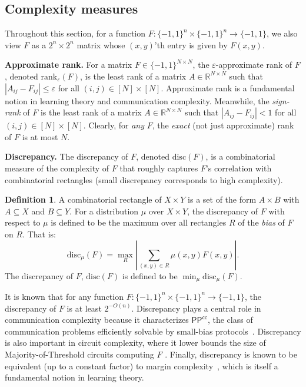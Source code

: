 \documentclass[11pt]{article}
\numberwithin{equation}{section}
\theoremstyle{definition}
\newtheorem{definition}[theorem]{Definition}
\theoremstyle{plain}
\newcommand{\R}{\mathbb R}
\newcommand{\bits}{\{-1,1\}}
\newcommand{\eps}{\varepsilon}
\begin{document}
\subsection{Complexity measures}
Throughout this section, for a function $F \colon \bits^n \times \bits^n \to \bits$,
we also view $F$ as a $2^n \times 2^n$ matrix whose $(x, y)$'th entry is given by $F(x, y)$.

\medskip \noindent \textbf{Approximate rank.} For a matrix $F \in \bits^{N \times N}$, 
the $\eps$-approximate rank of $F$, denoted $\text{rank}_{\eps}(F)$, is the least rank
of a matrix $A \in \R^{N \times N}$ such that $|A_{ij} - F_{ij}| \leq \eps$ for all $(i, j) \in [N] \times [N]$.
Approximate rank is a fundamental notion in learning theory and communication complexity.
Meanwhile, the \emph{sign-rank} of $F$ is the least rank of a matrix  $A \in \R^{N \times N}$ such that $|A_{ij} - F_{ij}| < 1$ for all $(i, j) \in [N] \times [N]$.
Clearly, for \emph{any} $F$, the \emph{exact} (not just approximate) rank of $F$ is at most $N$. 

%

\medskip \noindent \textbf{Discrepancy.} The discrepancy of $F$, denoted
$\mathrm{disc}(F)$, is a combinatorial measure of the complexity of $F$ that roughly
captures $F$'s correlation with combinatorial rectangles (small discrepancy
corresponds to high complexity).

\begin{definition} \label{def:disc}
	A combinatorial rectangle of $X \times Y$ is a set of the form $A \times B$ with $A \subseteq X$ and $B \subseteq Y$. 
	For a distribution $\mu$ over $X \times Y$, the discrepancy of $F$ with respect to $\mu$ is defined to be the maximum over all rectangles $R$ of the \emph{bias} of $F$ on $R$. That is:
	$$\mathrm{disc}_\mu(F) = \max_{R} \left|\sum_{(x, y) \in R} \mu(x, y) F(x, y)\right|.$$ The discrepancy of $F$, $\mathrm{disc}(F)$ is defined to be $\min_\mu \mathrm{disc}_\mu(F)$.
\end{definition}

It is known that for any function $F \colon \bits^n \times \bits^n \to \bits$, the discrepancy of $F$ is at least $2^{-O(n)}$. 
Discrepancy plays a central role in communication complexity because it characterizes
$\mathsf{PP}^{\mathsf{cc}}$, the
class of communication problems efficiently solvable by small-bias protocols~\cite{klauck2001lower}. Discrepancy is also important in circuit complexity, where it lower bounds
the size of Majority-of-Threshold circuits computing $F$ \cite{ghr, hajnal, nisan, sherstovmajmaj}. 
Finally, discrepancy
is known to be equivalent (up to a constant factor) to margin complexity~\cite{linial2009learning}, 
which is itself a fundamental notion in learning
theory. 
\end{document}
